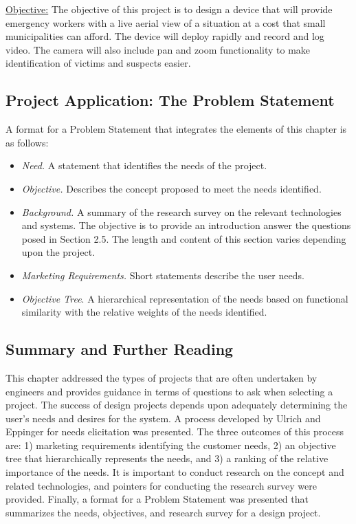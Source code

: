 \ul{Objective:} The objective of this project is to design a device that
will provide emergency workers with a live aerial view of a situation at
a cost that small municipalities can afford. The device will deploy
rapidly and record and log video. The camera will also include pan and
zoom functionality to make identification of victims and suspects
easier.

\subsection{\texorpdfstring{Project Application: The Problem Statement
}{Project Application: The Problem Statement }}\label{project-application-the-problem-statement}

A format for a Problem Statement that integrates the elements of this
chapter is as follows:

\begin{itemize}
\item
  \emph{Need.} A statement that identifies the needs of the project.
\item
  \emph{Objective.} Describes the concept proposed to meet the needs
  identified.
\item
  \emph{Background.} A summary of the research survey on the relevant
  technologies and systems. The objective is to provide an introduction
  answer the questions posed in Section 2.5. The length and content of
  this section varies depending upon the project.
\item
  \emph{Marketing Requirements.} Short statements describe the user
  needs.
\item
  \emph{Objective Tree}. A hierarchical representation of the needs
  based on functional similarity with the relative weights of the needs
  identified.
\end{itemize}

\subsection{\texorpdfstring{Summary and Further Reading
}{Summary and Further Reading }}\label{summary-and-further-reading}

This chapter addressed the types of projects that are often undertaken
by engineers and provides guidance in terms of questions to ask when
selecting a project. The success of design projects depends upon
adequately determining the user's needs and desires for the system. A
process developed by Ulrich and Eppinger for needs elicitation was
presented. The three outcomes of this process are: 1) marketing
requirements identifying the customer needs, 2) an objective tree that
hierarchically represents the needs, and 3) a ranking of the relative
importance of the needs. It is important to conduct research on the
concept and related technologies, and pointers for conducting the
research survey were provided. Finally, a format for a Problem Statement
was presented that summarizes the needs, objectives, and research survey
for a design project.

